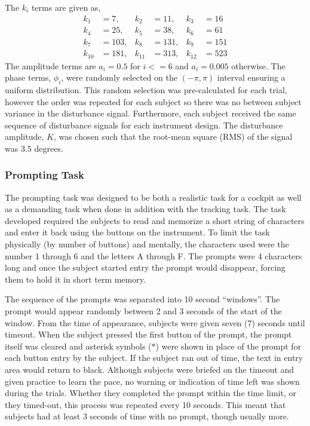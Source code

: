 The $k_i$ terms are given as,
\begin{align*}
    k_1 &= 7, & k_2 &= 11, & k_3 &= 16 \\
    k_4 &= 25, & k_5 &= 38, & k_6 &= 61 \\
    k_7 &= 103, & k_8 &= 131, & k_9 &= 151 \\
    k_{10} &= 181, & k_{11} &= 313, & k_{12} &= 523
\end{align*}
The amplitude terms are $a_i=0.5$ for $i <= 6$ and $a_i=0.005$ otherwise.
The phase terms, $\phi_i$, were randomly selected on the $(-\pi, \pi)$ interval ensuring a uniform distribution.
This random selection was pre-calculated for each trial, however the order was repeated for each subject so there was no between subject variance in the disturbance signal.
Furthermore, each subject received the same sequence of disturbance signals for each instrument design.
The disturbance amplitude, $K$, was chosen such that the root-mean square (RMS) of the signal was $3.5$ degrees.

\subsubsection{Prompting Task}

The prompting task was designed to be both a realistic task for a cockpit as well as a demanding task when done in addition with the tracking task.
The task developed required the subjects to read and memorize a short string of characters and enter it back using the buttons on the instrument.
To limit the task physically (by number of buttons) and mentally, the characters used were the number 1 through 6 and the letters A through F.
The prompts were 4 characters long and once the subject started entry the prompt would disappear, forcing them to hold it in short term memory.

The sequence of the prompts was separated into 10 second ``windows''.
The prompt would appear randomly between 2 and 3 seconds of the start of the window.
From the time of appearance, subjects were given seven (7) seconds until timeout.
When the subject pressed the first button of the prompt, the prompt itself was cleared and asterisk symbols ($*$) were shown in place of the prompt for each button entry by the subject.
If the subject ran out of time, the text in entry area would return to black.
Although subjects were briefed on the timeout and given practice to learn the pace, no warning or indication of time left was shown during the trials.
Whether they completed the prompt within the time limit, or they timed-out, this process was repeated every 10 seconds.
This meant that subjects had at least 3 seconds of time with no prompt, though usually more.


